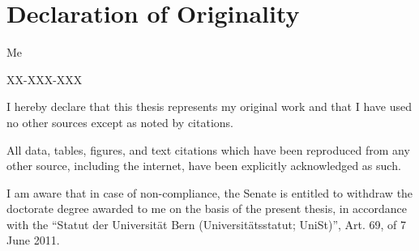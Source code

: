 \chapter*{Declaration of Originality}

{\setlength{\parskip}{10pt}
 Me

 XX-XXX-XXX
}

\vspace{1cm}

{\setlength{\parskip}{10pt}
\noindent I hereby declare that this thesis represents my original work and that I have used no other sources except as noted by citations.

\noindent All data, tables, figures, and text citations which have been reproduced from any other source, including the internet, have been explicitly acknowledged as such.

\noindent I am aware that in case of non-compliance, the Senate is entitled to withdraw the doctorate degree awarded to me on the basis of the present thesis, in accordance with the “Statut der Universität Bern (Universitätsstatut; UniSt)”, Art. 69, of 7 June 2011.
}
\vspace{1cm}

 \vspace{1cm}
\begin{figure}[h]
\hspace{2cm}
\vspace{-1cm}
\end{figure}
 